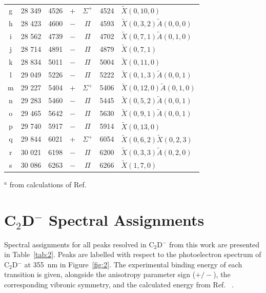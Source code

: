 \documentclass[journal=jacsat,manuscript=suppinfo]{achemso}
\newcommand{\onlinecite}[1]{\hspace{-1 ex} \nocite{#1}\citenum{#1}}
\begin{document}
\begin{table}
\begin{tabular}{c c c c c c l}
		g & 28 349 & 4526 & $+$ & $\Sigma^+$ & 4524 & $\tilde{X}(0,10,0)$  \\
		h  & 28 423 & 4600 & $-$ & $\Pi$ & 4593 & $\tilde{X}(0,3,2)\tilde{A}(0,0,0)$  \\
		i & 28 562 & 4739 & $-$ & $\Pi$ & 4702 & $\tilde{X}(0,7,1)\tilde{A}(0,1,0)$  \\
		j & 28 714 & 4891 & $-$ & $\Pi$ & 4879 & $\tilde{X}(0,7,1)$  \\
		k   & 28 834 & 5011 & $-$ & $\Pi$ & 5004 & $\tilde{X}(0,11,0)$  \\  
		l & 29 049 & 5226 & $-$ & $\Pi$ & 5222 & $\tilde{X}(0,1,3)\tilde{A}(0,0,1)$  \\
		m & 29 227 & 5404 & + & $\Sigma^+$ & 5406 & $\tilde{X}(0,12,0)\tilde{A}(0,1,0)$ \\
		n & 29 283 & 5460 & $-$ & $\Pi$ & 5445  & $\tilde{X}(0,5,2)\tilde{A}(0,0,1)$  \\
		o & 29 465 & 5642 & $-$ & $\Pi$ & 5630  & $\tilde{X}(0,9,1)\tilde{A}(0,0,1)$  \\
		p  & 29 740 & 5917 & $-$ & $\Pi$ & 5914 & $\tilde{X}(0,13,0)$ \\
		q & 29 844 & 6021 & + & $\Sigma^+$ & 6054 & $\tilde{X}(0,6,2)\tilde{X}(0,2,3)$ \\
		r & 30 021 & 6198 & $-$ & $\Pi$ & 6200 & $\tilde{X}(0,3,3)\tilde{A}(0,2,0)$ \\
		s & 30 086 & 6263 & $-$ & $\Pi$ & 6266 & $\tilde{X}(1,7,0)$ \\
	\end{tabular}
	\raggedright

$^a$ from calculations of Ref.~\onlinecite{tar03}
	
\end{table}

\section{C$_2$D$^-$ Spectral Assignments}
Spectral assignments for all peaks resolved in C$_2$D$^-$ from this work are presented in Table~\ref{tab:2}. Peaks are labelled with respect to the photoelectron spectrum of C$_2$D$^-$ at 355~nm in Figure~\ref{fig:2}. The experimental binding energy of each transition is given, alongside the anisotropy parameter sign ($+/-$), the corresponding vibronic symmetry, and the calculated energy from Ref.~\onlinecite{tar03}. 
\end{document}
